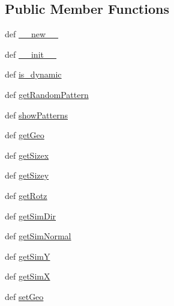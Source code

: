 \subsection*{Public Member Functions}
\begin{DoxyCompactItemize}
\item 
def \hyperlink{classdestruction_1_1_data_1_1_dynamic_pattern_generator_a563e5df15524f53b3643f9f273a83fb4}{\-\_\-\-\_\-new\-\_\-\-\_\-}
\item 
def \hyperlink{classdestruction_1_1_data_1_1_dynamic_pattern_generator_a619611054399ffa960725177e496fb2b}{\-\_\-\-\_\-init\-\_\-\-\_\-}
\item 
def \hyperlink{classdestruction_1_1_data_1_1_dynamic_pattern_generator_ae29a055c9bed9513bc4c56e4850d827e}{is\-\_\-dynamic}
\item 
def \hyperlink{classdestruction_1_1_data_1_1_dynamic_pattern_generator_a6d25028cb58987a3f2755e7b9f4f739b}{get\-Random\-Pattern}
\item 
def \hyperlink{classdestruction_1_1_data_1_1_dynamic_pattern_generator_ac7f08838cb266576ff4db35dc71e6804}{show\-Patterns}
\item 
def \hyperlink{classdestruction_1_1_data_1_1_dynamic_pattern_generator_a6a257a363a322e837ed25c4a204acba1}{get\-Geo}
\item 
def \hyperlink{classdestruction_1_1_data_1_1_dynamic_pattern_generator_ae93fb395fc1293c2b169302e8724275e}{get\-Sizex}
\item 
def \hyperlink{classdestruction_1_1_data_1_1_dynamic_pattern_generator_a9e0aea08a9d53cf9ce4b0ba103001b50}{get\-Sizey}
\item 
def \hyperlink{classdestruction_1_1_data_1_1_dynamic_pattern_generator_a4c3760d31bdc57ce830c4e630586006d}{get\-Rotz}
\item 
def \hyperlink{classdestruction_1_1_data_1_1_dynamic_pattern_generator_a7284a3fa429a95f689fc0464dea2c119}{get\-Sim\-Dir}
\item 
def \hyperlink{classdestruction_1_1_data_1_1_dynamic_pattern_generator_acc7d2cd58dfbd7b81869086dce56deff}{get\-Sim\-Normal}
\item 
def \hyperlink{classdestruction_1_1_data_1_1_dynamic_pattern_generator_a233e2dd4e877bb1f8ab11bc95c549995}{get\-Sim\-Y}
\item 
def \hyperlink{classdestruction_1_1_data_1_1_dynamic_pattern_generator_a59e06d93d817d8c12a71c8ad05b77d79}{get\-Sim\-X}
\item 
def \hyperlink{classdestruction_1_1_data_1_1_dynamic_pattern_generator_ac0999892259e6f0912f50679cf0ac753}{set\-Geo}
\end{DoxyCompactItemize}
